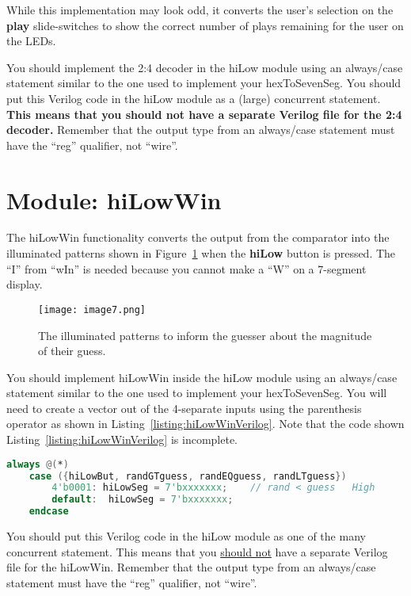 While this implementation may look odd, it converts the user's selection
on the \textbf{play} slide-switches to show the correct number of plays
remaining for the user on the LEDs.

You should implement the 2:4 decoder in the hiLow module using an
always/case statement similar to the one used to implement your
hexToSevenSeg. You should put this Verilog code in the hiLow module as a
(large) concurrent statement. \textbf{This means that you should not
have a separate Verilog file for the 2:4 decoder.} Remember that the
output type from an always/case statement must have the ``reg''
qualifier, not ``wire''.

\section{Module: hiLowWin}

The hiLowWin functionality converts the output from the comparator into
the illuminated patterns shown in Figure~\ref{fig:hiLowWinDisplay}
when the \textbf{hiLow}
button is pressed. The ``I'' from ``wIn'' is needed because you cannot
make a ``W'' on a 7-segment display.

\begin{figure}[ht]
    \texttt{[image: image7.png]}
    \caption{The illuminated patterns to inform the guesser about the
    magnitude of their guess.}
    \label{fig:hiLowWinDisplay}
\end{figure}

You should implement hiLowWin inside the hiLow module using an
always/case statement similar to the one used to implement your
hexToSevenSeg. You will need to create a vector out of the 4-separate
inputs using the parenthesis operator as shown in Listing~\ref{listing:hiLowWinVerilog}.
Note that the code shown Listing~\ref{listing:hiLowWinVerilog} is incomplete.

\begin{lstlisting}[language=Verilog,
 caption={Starter code for the hiLowWin module.},
 label={listing:hiLowWinVerilog},
 frame=single]
 always @(*)
    case ({hiLowBut, randGTguess, randEQguess, randLTguess})
        4'b0001: hiLowSeg = 7'bxxxxxxx;    // rand < guess   High
        default:  hiLowSeg = 7'bxxxxxxx;
    endcase
 \end{lstlisting}

You should put this Verilog code in the hiLow module as one of the many
concurrent statement. This means that you \uline{should not} have a
separate Verilog file for the hiLowWin. Remember that the output type
from an always/case statement must have the ``reg'' qualifier, not
``wire''.

